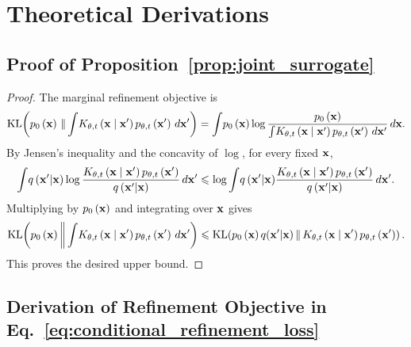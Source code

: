\section{Theoretical Derivations}\label{app:proofs}

\subsection{Proof of Proposition~\ref{prop:joint_surrogate}}

\begin{proof}
The marginal refinement objective is
\begin{equation*}
    \operatorname{KL}\!\left(
        p_0\left(\mathbf{x}\right)
        \,\|\,
         {  \int}
    K_{\theta,t}\left(\mathbf{x}\mid\mathbf{x}'\right)
    p_{\theta,t}\left(\mathbf{x}'\right)
    \,d\mathbf{x}'
    \right)
    =
    {  \int}
    p_0\left(\mathbf{x}\right)
    \log
    \frac{
        p_0\left(\mathbf{x}\right)
    }{
        {  \int}
        K_{\theta,t}\left(\mathbf{x}\mid\mathbf{x}'\right)
        p_{\theta,t}\left(\mathbf{x}'\right)
        \,d\mathbf{x}'
    }
    \,d\mathbf{x} .
\end{equation*}
By Jensen's inequality and the concavity of $\log$, for every fixed $\mathbf{x}$,
\begin{equation*}
    {  \int}
    q\left(\mathbf{x}'|\mathbf{x}\right)
    \log \frac{K_{\theta,t}\left(\mathbf{x}\mid\mathbf{x}'\right)
    p_{\theta,t}
    \left(\mathbf{x}'\right)}{{q\left(\mathbf{x}'|\mathbf{x}\right)}}
    \,d\mathbf{x}'
    \leqslant
    \log
    {  \int}
    {q\left(\mathbf{x}'|\mathbf{x}\right)}\frac{K_{\theta,t}\left(\mathbf{x}\mid\mathbf{x}'\right)
    p_{\theta,t}
    \left(\mathbf{x}'\right)}{{q\left(\mathbf{x}'|\mathbf{x}\right)}}
    \,d\mathbf{x}' .
\end{equation*}
Multiplying by $p_0\left(\mathbf{x}\right)$ and integrating over $\mathbf{x}$ gives
\begin{equation*}
    \operatorname{KL}\!\left(
        p_0\left(\mathbf{x}\right)
        \,\middle\|\,
        {  \int}
        K_{\theta,t}\left(\mathbf{x}\mid\mathbf{x}'\right)
        p_{\theta,t}\left(\mathbf{x}'\right)
        \,d\mathbf{x}'
    \right)
    \leqslant
    \operatorname{KL}\!\left(
        p_0\left(\mathbf{x}\right)q(\mathbf{x}'|\mathbf{x})
        \,\middle\|\,
        K_{\theta,t}\left(\mathbf{x}\mid\mathbf{x}'\right)p_{\theta,t}\left(\mathbf{x}'\right)
    \right).
\end{equation*}
This proves the desired upper bound.
\end{proof}


\subsection{Derivation of Refinement Objective in Eq.~\eqref{eq:conditional_refinement_loss}}

